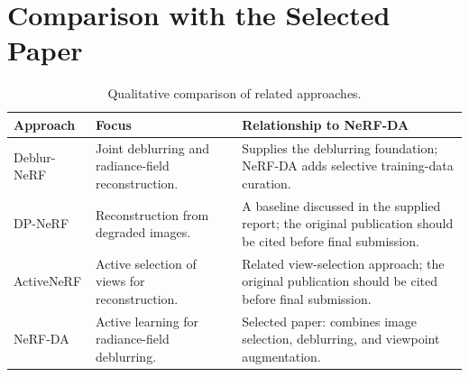 
\section{Comparison with the Selected Paper}
\begin{table}[htbp]
\centering\small
\begin{tabular}{|p{2.4cm}|p{4.4cm}|p{5.4cm}|}\hline
\textbf{Approach} & \textbf{Focus} & \textbf{Relationship to NeRF-DA} \\\hline
Deblur-NeRF & Joint deblurring and radiance-field reconstruction. & Supplies the deblurring foundation; NeRF-DA adds selective training-data curation. \\\hline
DP-NeRF & Reconstruction from degraded images. & A baseline discussed in the supplied report; the original publication should be cited before final submission. \\\hline
ActiveNeRF & Active selection of views for reconstruction. & Related view-selection approach; the original publication should be cited before final submission. \\\hline
NeRF-DA & Active learning for radiance-field deblurring. & Selected paper: combines image selection, deblurring, and viewpoint augmentation.\cite{bib1} \\\hline
\end{tabular}
\caption{Qualitative comparison of related approaches.}
\end{table}
